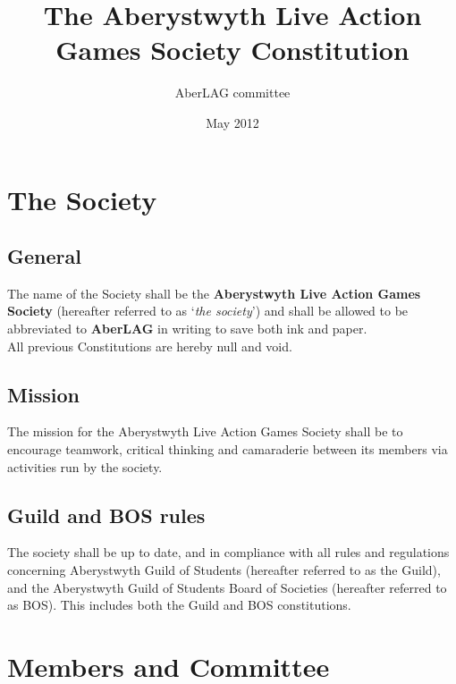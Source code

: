 \documentclass{report}
\newcommand{\society}{Aberystwyth Live Action Games Society}
\begin{document}
\title{The Aberystwyth Live Action Games Society Constitution}
\author{AberLAG committee}
\date{May 2012}
\maketitle{}

\tableofcontents
\newpage

\chapter{The Society}

\section{General}

The name of the Society shall be the \textbf{\society} (hereafter referred to as `{\em the society}') and shall be allowed to be abbreviated to \textbf{AberLAG} in writing to save both ink and paper. \\

\noindent All previous Constitutions are hereby null and void.

\section{Mission}

The mission for the \society{} shall be to encourage teamwork, critical thinking and camaraderie between its members via activities run by the society.

\section{Guild and BOS rules}

The society shall be up to date, and in compliance with all rules and regulations concerning Aberystwyth Guild of Students (hereafter referred to as the Guild), and the Aberystwyth Guild of Students Board of Societies (hereafter referred to as BOS). This includes both the Guild and BOS constitutions.

\chapter{Members and Committee}
\end{document}

